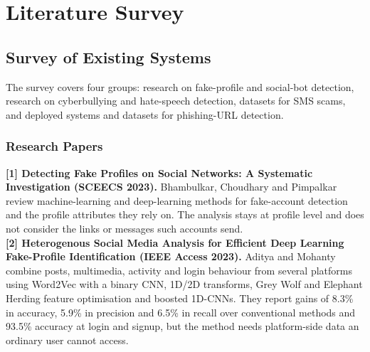 
\onehalfspacing

\pagestyle{fancy}
\fancyhf{}
\renewcommand{\headrulewidth}{0pt}
\cfoot{\thepage}
\chapter{Literature Survey}

\section{Survey of Existing Systems}
\noindent The survey covers four groups: research on fake-profile and social-bot detection, research on cyberbullying and hate-speech detection, datasets for SMS scams, and deployed systems and datasets for phishing-URL detection.

\subsection{Research Papers}
\noindent\textbf{[1] Detecting Fake Profiles on Social Networks: A Systematic Investigation (SCEECS 2023).} Bhambulkar, Choudhary and Pimpalkar \cite{lit1} review machine-learning and deep-learning methods for fake-account detection and the profile attributes they rely on. The analysis stays at profile level and does not consider the links or messages such accounts send.\\

\noindent\textbf{[2] Heterogenous Social Media Analysis for Efficient Deep Learning Fake-Profile Identification (IEEE Access 2023).} Aditya and Mohanty \cite{lit2} combine posts, multimedia, activity and login behaviour from several platforms using Word2Vec with a binary CNN, 1D/2D transforms, Grey Wolf and Elephant Herding feature optimisation and boosted 1D-CNNs. They report gains of 8.3\% in accuracy, 5.9\% in precision and 6.5\% in recall over conventional methods and 93.5\% accuracy at login and signup, but the method needs platform-side data an ordinary user cannot access.\\

